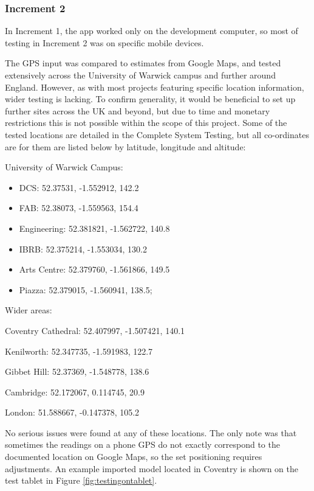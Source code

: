 \documentclass[12pt, a4paper]{article}
\begin{document}
\subsubsection{Increment 2}
In Increment 1, the app worked only on the development computer, so most of testing in Increment 2 was on specific mobile devices. 

The GPS input was compared to estimates from Google Maps, and tested extensively across the University of Warwick campus and further around England. However, as with most projects featuring specific location information, wider testing is lacking. To confirm generality, it would be beneficial to set up further sites across the UK and beyond, but due to time and monetary restrictions this is not possible within the scope of this project. Some of the tested locations are detailed in the Complete System Testing, but all co-ordinates are for them are listed below by latitude, longitude and altitude:

\begin{multicols}{2}
    \small
    University of Warwick Campus:
    \begin{itemize}
        \item DCS: 52.37531, -1.552912, 142.2
        \item FAB: 52.38073, -1.559563, 154.4
        \item Engineering: 52.381821, -1.562722, 140.8
        \item IBRB: 52.375214, -1.553034, 130.2
        \item Arts Centre: 52.379760, -1.561866, 149.5
        \item Piazza: 52.379015, -1.560941, 138.5;
    \end{itemize}
    
    Wider areas: 
    \begin{itemize}
        \item Coventry Cathedral: 52.407997, -1.507421, 140.1
        \item Kenilworth: 52.347735, -1.591983, 122.7
        \item Gibbet Hill: 52.37369, -1.548778, 138.6
        \item Cambridge: 52.172067, 0.114745, 20.9 
        \item London: 51.588667, -0.147378, 105.2
        \textcolor{white}{\item} 
    \end{itemize}
\end{multicols}

No serious issues were found at any of these locations. The only note was that sometimes the readings on a phone GPS do not exactly correspond to the documented location on Google Maps, so the set positioning requires adjustments. An example imported model located in Coventry is shown on the test tablet in Figure \ref{fig:testingontablet}.
\end{document}
